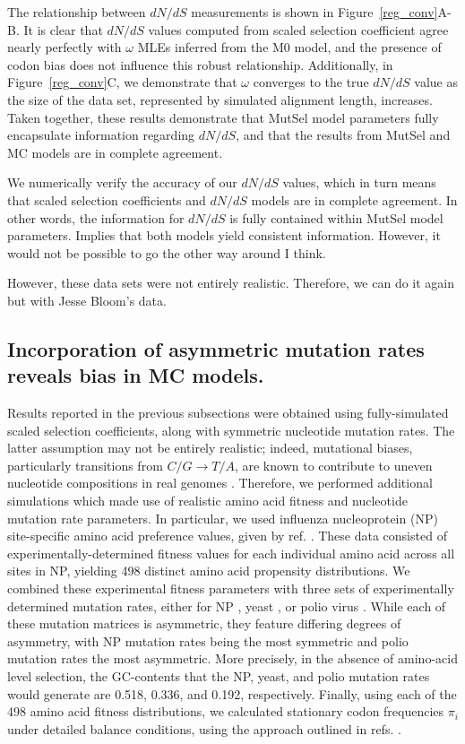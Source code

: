 \documentclass{pnastwo}
\begin{document}
\begin{article}
The relationship between $dN/dS$ measurements is shown in Figure~\ref{reg_conv}A-B. It is clear that $dN/dS$ values computed from scaled selection coefficient agree nearly perfectly with $\omega$ MLEs inferred from the M0 model, and the presence of codon bias does not influence this robust relationship. Additionally, in Figure~\ref{reg_conv}C, we demonstrate that $\omega$ converges to the true $dN/dS$ value as the size of the data set, represented by simulated alignment length, increases. Taken together, these results demonstrate that MutSel model parameters fully encapsulate information regarding $dN/dS$, and that the results from MutSel and MC models are in complete agreement.

We numerically verify the accuracy of our $dN/dS$ values, which in turn means that scaled selection coefficients and $dN/dS$ models are in complete agreement. In other words, the information for $dN/dS$ is fully contained within MutSel model parameters. Implies that both models yield consistent information. However, it would not be possible to go the other way around I think.

However, these data sets were not entirely realistic. Therefore, we can do it again but with Jesse Bloom's data. 


\subsection*{Incorporation of asymmetric mutation rates reveals bias in MC models.}
		
Results reported in the previous subsections were obtained using fully-simulated scaled selection coefficients, along with symmetric nucleotide mutation rates. The latter assumption may not be entirely realistic; indeed, mutational biases, particularly transitions from $C/G \rightarrow T/A$, are known to contribute to uneven nucleotide compositions in real genomes \cite{Hernandez2007,HershbergPetrov2010,Zhu2014,Acevedo2014}. Therefore, we performed additional simulations which made use of realistic amino acid fitness and nucleotide mutation rate parameters. In particular, we used influenza nucleoprotein (NP) site-specific amino acid preference values, given by ref. \cite{Bloom2014a}. These data consisted of experimentally-determined fitness values for each individual amino acid across all sites in NP, yielding 498 distinct amino acid propensity distributions. We combined these experimental fitness parameters with three sets of experimentally determined mutation rates, either for NP \cite{Bloom2014a}, yeast \cite{Zhu2014}, or polio virus \cite{Acevedo2014}. While each of these mutation matrices is asymmetric, they feature differing degrees of asymmetry, with NP mutation rates being the most symmetric and polio mutation rates the most asymmetric. More precisely, in the absence of amino-acid level selection, the GC-contents that the NP, yeast, and polio mutation rates would generate are 0.518, 0.336, and 0.192, respectively. Finally, using each of the 498 amino acid fitness distributions, we calculated stationary codon frequencies $\pi_i$ under detailed balance conditions, using the approach outlined in refs. \cite{Bloom2014a,Bloom2014b}. 
		

\end{article}
\end{document}
